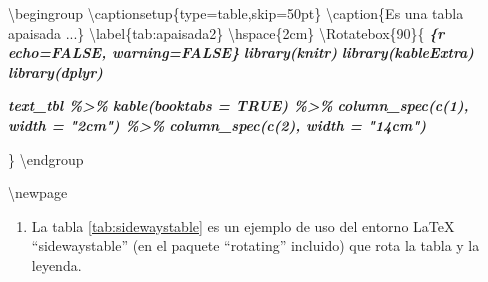 \documentclass[12pt,a4paper,]{book}
\newenvironment{Shaded}{\begin{snugshade}}{\end{snugshade}}
\newcommand{\InformationTok}[1]{\textcolor[rgb]{0.56,0.35,0.01}{\textbf{\textit{#1}}}}
\newcommand{\NormalTok}[1]{#1}
\providecommand{\tightlist}{%
  \setlength{\itemsep}{0pt}\setlength{\parskip}{0pt}}
\numberwithin{dummy}{section}
\theoremstyle{ocrenumbox}
\theoremstyle{blacknumex}
\theoremstyle{blacknumbox}
\theoremstyle{ocrenum}
\theoremstyle{ocrenum}
\begin{document}
\begin{Shaded}
\begin{Highlighting}[]

\NormalTok{\textbackslash{}begingroup}
\NormalTok{\textbackslash{}captionsetup\{type=table,skip=50pt\}}
\NormalTok{\textbackslash{}caption\{Es una tabla apaisada ...\} \textbackslash{}label\{tab:apaisada2\}}
\NormalTok{\textbackslash{}hspace\{2cm\}}
\NormalTok{\textbackslash{}Rotatebox\{90\}\{}
\InformationTok{\textasciigrave{}\textasciigrave{}\textasciigrave{}\{r echo=FALSE, warning=FALSE\}}
\InformationTok{library(knitr)}
\InformationTok{library(kableExtra)}
\InformationTok{library(dplyr)}

\InformationTok{text\_tbl \%\textgreater{}\%}
\InformationTok{  kable(booktabs = TRUE) \%\textgreater{}\% }
\InformationTok{      column\_spec(c(1), width = "2cm") \%\textgreater{}\% }
\InformationTok{      column\_spec(c(2), width = "14cm")}

\InformationTok{\textasciigrave{}\textasciigrave{}\textasciigrave{}}
\NormalTok{\}}
\NormalTok{\textbackslash{}endgroup}

\NormalTok{\textbackslash{}newpage}
\end{Highlighting}
\end{Shaded}

\begin{enumerate}
\def\labelenumi{\arabic{enumi}.}
\setcounter{enumi}{2}
\tightlist
\item
  La tabla \ref{tab:sidewaystable} es un ejemplo de uso del entorno
  LaTeX ``sidewaystable'' (en el paquete ``rotating'' incluido) que rota
  la tabla y la leyenda.
\end{enumerate}
\end{document}
